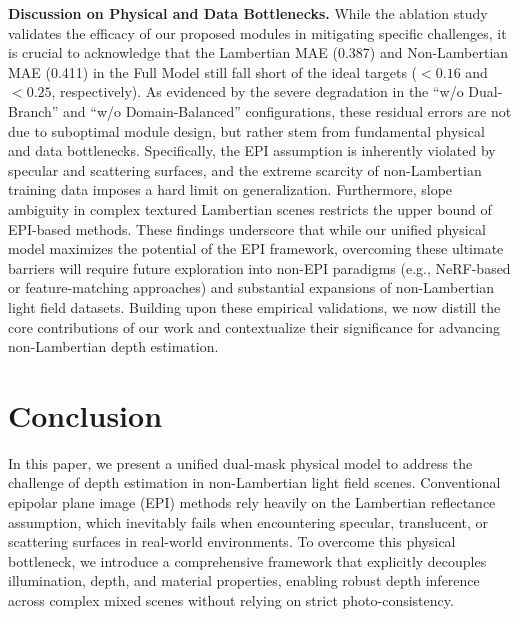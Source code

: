 \documentclass[lettersize,journal]{IEEEtran}
\begin{document}
\textbf{Discussion on Physical and Data Bottlenecks.} 
While the ablation study validates the efficacy of our proposed modules in mitigating specific challenges, it is crucial to acknowledge that the Lambertian MAE (0.387) and Non-Lambertian MAE (0.411) in the Full Model still fall short of the ideal targets ($<0.16$ and $<0.25$, respectively). As evidenced by the severe degradation in the ``w/o Dual-Branch'' and ``w/o Domain-Balanced'' configurations, these residual errors are not due to suboptimal module design, but rather stem from fundamental physical and data bottlenecks. Specifically, the EPI assumption is inherently violated by specular and scattering surfaces, and the extreme scarcity of non-Lambertian training data imposes a hard limit on generalization. Furthermore, slope ambiguity in complex textured Lambertian scenes restricts the upper bound of EPI-based methods. These findings underscore that while our unified physical model maximizes the potential of the EPI framework, overcoming these ultimate barriers will require future exploration into non-EPI paradigms (e.g., NeRF-based or feature-matching approaches) and substantial expansions of non-Lambertian light field datasets. Building upon these empirical validations, we now distill the core contributions of our work and contextualize their significance for advancing non-Lambertian depth estimation.

\section{Conclusion}

In this paper, we present a unified dual-mask physical model to address the challenge of depth estimation in non-Lambertian light field scenes. Conventional epipolar plane image (EPI) methods rely heavily on the Lambertian reflectance assumption, which inevitably fails when encountering specular, translucent, or scattering surfaces in real-world environments. To overcome this physical bottleneck, we introduce a comprehensive framework that explicitly decouples illumination, depth, and material properties, enabling robust depth inference across complex mixed scenes without relying on strict photo-consistency.
\end{document}
